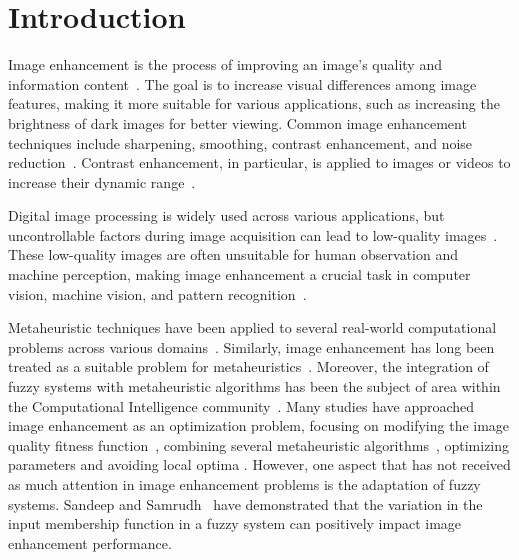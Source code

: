 \section{Introduction}
Image enhancement is the process of improving an image's quality and information content~\cite{singh2014various}. The goal is to increase visual differences among image features, making it more suitable for various applications, such as increasing the brightness of dark images for better viewing. Common image enhancement techniques include sharpening, smoothing, contrast enhancement, and noise reduction~\cite{nevriyanto2017image,draa2014artificial,shaked2005sharpness,berkner2001multiscale}. Contrast enhancement, in particular, is applied to images or videos to increase their dynamic range~\cite{hashemi2010image}.

Digital image processing is widely used across various applications, but uncontrollable factors during image acquisition can lead to low-quality images~\cite{WWYG2020,arici2009histogram}. 
These low-quality images are often unsuitable for human observation and machine perception, making image enhancement a crucial task in computer vision, machine vision, and pattern recognition~\cite{YSWH2023,JW2022,ITVM2018}.

Metaheuristic techniques have been applied to several real-world computational problems across various domains~\cite{IMMNR2019,KM2024,KESHFM2022,AKR2018,KMNHR2023}.
Similarly, image enhancement has long been treated as a suitable problem for metaheuristics~\cite{cuckoo_search_and_PSO,ACO_GA_SA,munteanu2004gray,mukhopadhyay2023image}. Moreover, the integration of fuzzy systems with metaheuristic algorithms has been the subject of area within the Computational Intelligence 
community~\cite{fuzzy_plus_meta,diaz2017new}. Many studies have approached image enhancement as an optimization problem, focusing on modifying the image quality fitness function~\cite{cuckoo_search_and_PSO,draa2014artificial,oloyede2019new}, combining several metaheuristic algorithms~\cite{cuckoo_search_and_PSO,ACO_GA_SA}, optimizing parameters \cite{samanta2018log} and avoiding local optima \cite{dos2009differential}. However, one aspect that has not received as much attention in image enhancement problems is the adaptation of fuzzy systems. Sandeep and Samrudh~\cite{s2018image} have demonstrated that the variation in the input membership function in a fuzzy system can positively impact image enhancement performance.

